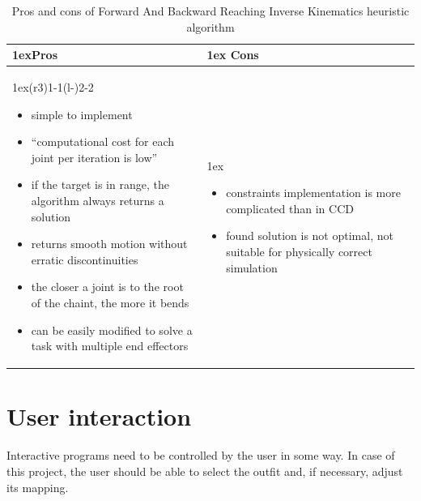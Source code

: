 \documentclass[a4paper]{report}
\begin{document}
\begin{table}[H]
\begin{tabularx}{\linewidth}{>{\parskip1ex}X@{\kern4\tabcolsep}>{\parskip1ex}X}
\toprule
\hfil\bfseries Pros
&
\hfil\bfseries Cons
\\\cmidrule(r{3\tabcolsep}){1-1}\cmidrule(l{-\tabcolsep}){2-2}

\begin{itemize}
    \item simple to implement 
    \item “computational cost for each joint per iteration is low” \cite{IKtechniques}
    \item if the target is in range, the algorithm always returns a solution \cite{IKtechniques}
    \item returns smooth motion without erratic discontinuities \cite{IKtechniques}
    \item the closer a joint is to the root of the chaint, the more it bends \cite{IKtechniques}
    \item can be easily modified to solve a task with multiple end effectors \cite{IKtechniques}
\end{itemize}

&


\begin{itemize}
    \item constraints implementation is more complicated than in CCD \cite{IKtechniques}
    \item found solution is not optimal, not suitable for physically correct simulation
\end{itemize}

\\\bottomrule
\end{tabularx}
\caption{Pros and cons of Forward And Backward Reaching Inverse Kinematics heuristic algorithm}
\label{FABRIK_pro_con}
\end{table}




\section{User interaction}
\label{section_UI}
 \qquad Interactive programs need to be controlled by the user in some way. In case of this project, the user should be able to select the outfit and, if necessary, adjust its mapping.
 
\end{document}
